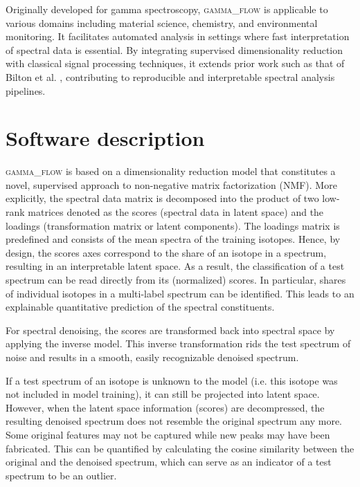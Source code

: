 \documentclass[preprint, 12pt, a4paper]{elsarticle}
\begin{document}
Originally developed for gamma spectroscopy, \textsc{gamma\_flow} is applicable to various domains including material science, chemistry, and environmental monitoring. It facilitates automated analysis in settings where fast interpretation of spectral data is essential. By integrating supervised dimensionality reduction with classical signal processing techniques, it extends prior work such as that of Bilton et al. \cite{Bilton2019}, contributing to reproducible and interpretable spectral analysis pipelines.



\section{Software description}
\label{sec:software_description}

\textsc{gamma\_flow} is based on a dimensionality reduction model that constitutes a novel, supervised approach to non-negative matrix factorization (NMF). More explicitly, the spectral data matrix is decomposed into the product of two low-rank matrices denoted as the scores (spectral data in latent space) and the loadings (transformation matrix or latent components). The loadings matrix is predefined and consists of the mean spectra of the training isotopes. Hence, by design, the scores axes correspond to the share of an isotope in a spectrum, resulting in an interpretable latent space. As a result, the classification of a test spectrum can be read directly from its (normalized) scores. In particular, shares of individual isotopes in a multi-label spectrum can be identified. This leads to an explainable quantitative prediction of the spectral constituents. 

For spectral denoising, the scores are transformed back into spectral space by applying the inverse model. This inverse transformation rids the test spectrum of noise and results in a smooth, easily recognizable denoised spectrum. 

If a test spectrum of an isotope is unknown to the model (i.e. this isotope was not included in model training), it can still be projected into latent space. However, when the latent space information (scores) are decompressed, the resulting denoised spectrum does not resemble the original spectrum any more. Some original features may not be captured while new peaks may have been fabricated. This can be quantified by calculating the cosine similarity between the original and the denoised spectrum, which can serve as an indicator of a test spectrum 
to be an outlier.
\end{document}
